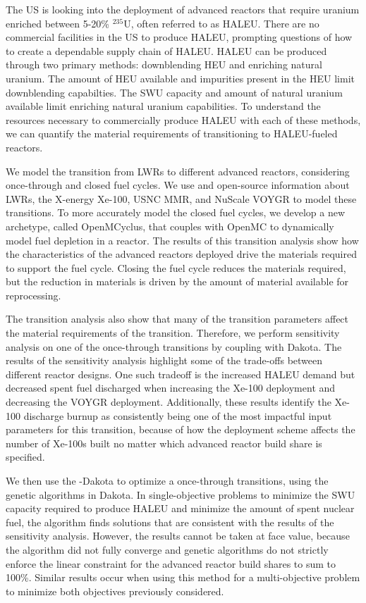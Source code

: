 The US is looking into the deployment of advanced reactors that 
require uranium enriched between 5-20\% $^{235}$U, often referred to 
as \gls{HALEU}. There are no commercial facilities 
in the US to produce \gls{HALEU}, 
prompting questions of how to create a dependable supply chain of \gls{HALEU}. 
\gls{HALEU} can be produced through two primary methods: downblending 
\gls{HEU} and enriching natural uranium. The amount of \gls{HEU} available 
and impurities present in the \gls{HEU} limit downblending capabilties.
The \gls{SWU} capacity and amount of natural uranium available limit 
enriching natural uranium capabilities. To understand the resources necessary 
to commercially produce \gls{HALEU} with each of these methods, we can 
quantify the material requirements of transitioning to \gls{HALEU}-fueled 
reactors. 

We model the transition from \glspl{LWR} to different 
advanced reactors, considering once-through and closed 
fuel cycles. We use \Cyclus and open-source 
information about \glspl{LWR}, the X-energy Xe-100, 
\gls{USNC} \gls{MMR}, and NuScale VOYGR to model these 
transitions. To more accurately model the closed fuel 
cycles, we develop a new \Cyclus archetype, called OpenMCyclus, 
that couples with OpenMC to dynamically model fuel depletion in a 
reactor.  
The results of this transition analysis show how the 
characteristics of the advanced reactors deployed drive 
the materials required to support the fuel cycle. Closing the 
fuel cycle reduces the materials required, but the 
reduction in materials is driven by the amount of material 
available for reprocessing. 

The transition analysis also show that many of the transition 
parameters affect  the material requirements 
of the transition. Therefore, we perform sensitivity 
analysis on one of the once-through transitions by coupling 
\Cyclus with Dakota. The results of 
the sensitivity analysis highlight some of the trade-offs between 
different reactor designs. One such tradeoff is the increased 
\gls{HALEU} demand but decreased spent fuel discharged when increasing 
the Xe-100 deployment and decreasing the VOYGR  deployment. Additionally, 
these results identify the Xe-100 discharge burnup as consistently 
being one of the most impactful input parameters for this transition, 
because of how the deployment scheme affects the number of 
Xe-100s built no matter which advanced reactor build share is 
specified. 

We then use the \Cyclus-Dakota to optimize a once-through transitions, 
using the genetic algorithms in Dakota. In single-objective problems to 
minimize the \gls{SWU} capacity required to produce \gls{HALEU} and 
minimize the amount of spent nuclear fuel, the algorithm finds 
solutions that are consistent with the results of the 
sensitivity analysis. However, the results cannot be taken at face 
value, because the algorithm did not fully converge and genetic 
algorithms do not strictly enforce the 
linear constraint for the advanced reactor build shares to sum to 
100\%. Similar results occur when using 
this method for a multi-objective problem to minimize both objectives 
previously considered. 

